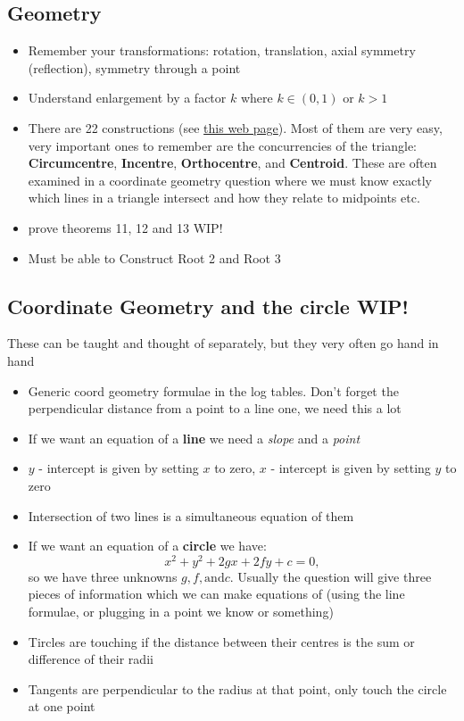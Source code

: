 \documentclass[10pt,a4paper]{article}
\begin{document}
\subsection{Geometry}
    \begin{itemize}
        \item Remember your transformations: rotation, translation, axial symmetry (reflection), symmetry through a point
        \item Understand enlargement by a factor $k$ where $k\in (0,1) $ or $k>1$
        \item There are 22 constructions (see \href{http://gofree.indigo.ie/~hallinan/ProjectMaths/LC_Geometry_Strand2/Leaving_Cert_Geometry_summary_constructions.htm}{this web page}). Most of them are very easy, very important ones to remember are the concurrencies of the triangle: \textbf{Circumcentre}, \textbf{Incentre}, \textbf{Orthocentre}, and \textbf{Centroid}. These are often examined in a coordinate geometry question where we must know exactly which lines in a triangle intersect and how they relate to midpoints etc.
        \item prove theorems 11, 12 and 13 \textcolor{gren2}{WIP!}
        \item Must be able to Construct Root 2 and Root 3
    \end{itemize}
\subsection{Coordinate Geometry and the circle \textcolor{gren2}{WIP!}} 
These can be taught and thought of separately, but they very often go hand in hand
    \begin{itemize}
        \item Generic coord geometry formulae in the log tables. Don't forget the perpendicular distance from a point to a line one, we need this a lot
        \item If we want an equation of a \textbf{line} we need a \textit{slope} and a \textit{point}
        \item $y$ - intercept is given by setting $x$ to zero, $x$ - intercept is given by setting $y$ to zero
        \item Intersection of two lines is a simultaneous equation of them
        \item If we want an equation of a \textbf{circle} we have: 
        \begin{equation}
            x^2 +y^2 +2gx+2fy+c=0,
        \end{equation}
        so we have three unknowns $g,f, \text{and} c$. Usually the question will give three pieces of information which we can make equations of (using the line formulae, or plugging in a point we know or something)
        \item Tircles are touching if the distance between their centres is the sum or difference of their radii
        \item Tangents are perpendicular to the radius at that point, only touch the circle at one point
    \end{itemize}
\end{document}

